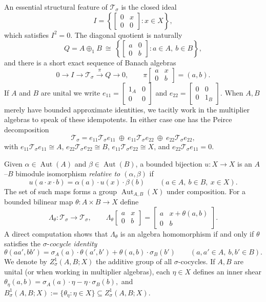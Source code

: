 \documentclass{article}
\theoremstyle{plain}
\theoremstyle{definition}
\newcommand{\T}{\mathcal{T}}
\newcommand{\Aut}{\operatorname{Aut}}
\begin{document}
An essential structural feature of \(\T_\sigma\) is the closed ideal
\[
I=\left\{\begin{bmatrix}0&x\\[2pt]0&0\end{bmatrix}: x\in X\right\},
\]
which satisfies \(I^2=0\).
The diagonal quotient is naturally
\[
Q=A\oplus_1 B \ \cong\ \left\{\begin{bmatrix}a&0\\[2pt]0&b\end{bmatrix}: a\in A,\ b\in B\right\},
\]
and there is a short exact sequence of Banach algebras
\[
0\longrightarrow I \longrightarrow \T_\sigma \xrightarrow{\ \pi\ } Q \longrightarrow 0,
\qquad
\pi\!\begin{bmatrix}a&x\\[2pt]0&b\end{bmatrix}=(a,b).
\]
If \(A\) and \(B\) are unital we write
\(
e_{11}=\begin{bmatrix}1_A&0\\[2pt]0&0\end{bmatrix}
\)
and
\(
e_{22}=\begin{bmatrix}0&0\\[2pt]0&1_B\end{bmatrix}.
\)
When \(A,B\) merely have bounded approximate identities, we tacitly work in the multiplier algebras to speak of these idempotents.
In either case one has the Peirce decomposition
\[
\T_\sigma = e_{11}\T_\sigma e_{11}\ \oplus\ e_{11}\T_\sigma e_{22}\ \oplus\ e_{22}\T_\sigma e_{22},
\]
with \(e_{11}\T_\sigma e_{11}\cong A\), \(e_{22}\T_\sigma e_{22}\cong B\), \(e_{11}\T_\sigma e_{22}\cong X\), and \(e_{22}\T_\sigma e_{11}=0\).

Given \(\alpha\in\Aut(A)\) and \(\beta\in\Aut(B)\), a bounded bijection \(u:X\to X\) is an \(A\)--\(B\) bimodule isomorphism \emph{relative to \((\alpha,\beta)\)} if
\[
u(a\cdot x\cdot b)=\alpha(a)\cdot u(x)\cdot\beta(b)\qquad(a\in A,\ b\in B,\ x\in X).
\]
The set of such maps forms a group \(\Aut_{A,B}(X)\) under composition.
For a bounded bilinear map \(\theta:A\times B\to X\) define
\[
\Lambda_\theta:\T_\sigma\to \T_\sigma,\qquad
\Lambda_\theta\!\begin{bmatrix}a&x\\[2pt]0&b\end{bmatrix}
=
\begin{bmatrix}a&x+\theta(a,b)\\[2pt]0&b\end{bmatrix}.
\]
A direct computation shows that \(\Lambda_\theta\) is an algebra homomorphism if and only if \(\theta\) satisfies the \(\sigma\)-\emph{cocycle identity}
\begin{equation}\label{eq:cocycle}
\theta(aa',bb')=\sigma_A(a)\cdot \theta(a',b')+\theta(a,b)\cdot \sigma_B(b')
\qquad(a,a'\in A,\ b,b'\in B).
\end{equation}
We denote by \(Z^1_\sigma(A,B;X)\) the additive group of all \(\sigma\)-cocycles.
If \(A,B\) are unital (or when working in multiplier algebras), each \(\eta\in X\) defines an inner shear
\(
\theta_\eta(a,b)=\sigma_A(a)\cdot \eta-\eta\cdot \sigma_B(b),
\)
and \(B^1_\sigma(A,B;X):=\{\theta_\eta:\eta\in X\}\subseteq Z^1_\sigma(A,B;X)\).
\end{document}
